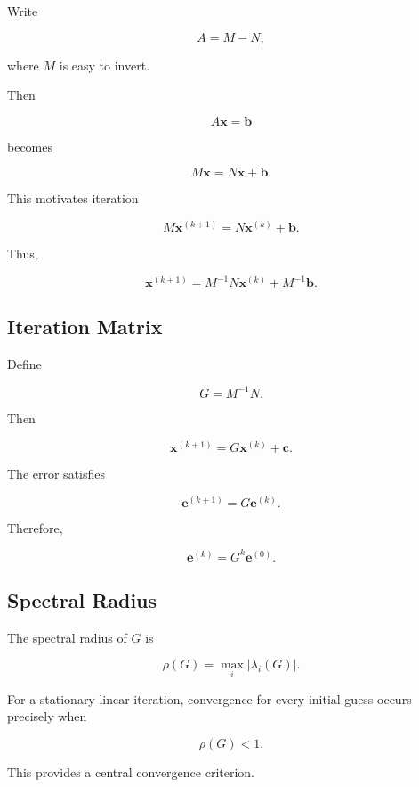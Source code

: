 Write

\[
\boxed{
A
=
M-N,
}
\]

where \(M\) is easy to invert.

Then

\[
A\mathbf{x}
=
\mathbf{b}
\]

becomes

\[
M\mathbf{x}
=
N\mathbf{x}
+
\mathbf{b}.
\]

This motivates iteration

\[
\boxed{
M\mathbf{x}^{(k+1)}
=
N\mathbf{x}^{(k)}
+
\mathbf{b}.
}
\]

Thus,

\[
\boxed{
\mathbf{x}^{(k+1)}
=
M^{-1}N\mathbf{x}^{(k)}
+
M^{-1}\mathbf{b}.
}
\]

\subsection{Iteration Matrix}
\label{subsec:iteration-matrix}

Define

\[
\boxed{
G
=
M^{-1}N.
}
\]

Then

\[
\boxed{
\mathbf{x}^{(k+1)}
=
G\mathbf{x}^{(k)}
+
\mathbf{c}.
}
\]

The error satisfies

\[
\boxed{
\mathbf{e}^{(k+1)}
=
G\mathbf{e}^{(k)}.
}
\]

Therefore,

\[
\boxed{
\mathbf{e}^{(k)}
=
G^k
\mathbf{e}^{(0)}.
}
\]

\subsection{Spectral Radius}
\label{subsec:spectral-radius-iteration}

The spectral radius of \(G\) is

\[
\boxed{
\rho(G)
=
\max_i
|\lambda_i(G)|.
}
\]

For a stationary linear iteration, convergence for every initial guess
occurs precisely when

\[
\boxed{
\rho(G)<1.
}
\]

This provides a central convergence criterion.

